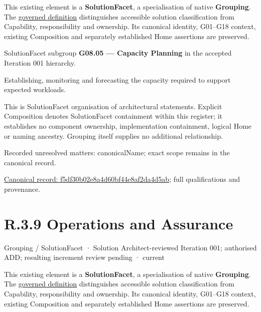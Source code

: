 This existing element is a \textbf{SolutionFacet}, a specialisation of native
\textbf{Grouping}. The \href{\detokenize{../../../../../../../governance/continuum-representation.md#solutionfacet-classification--1119-candidate}}{governed definition}
distinguishes accessible solution classification from Capability, responsibility
and ownership. Its canonical identity, G01–G18 context, existing Composition
and separately established Home assertions are preserved.



SolutionFacet subgroup \textbf{G08.05 — Capacity Planning} in the accepted Iteration 001 hierarchy.



Establishing, monitoring and forecasting the capacity required to support expected workloads.



This is SolutionFacet organisation of architectural statements. Explicit Composition denotes SolutionFacet containment within this register; it establishes no component ownership, implementation containment, logical Home or naming ancestry. Grouping itself supplies no additional relationship.


{\small Recorded unresolved matters: canonicalName; exact scope remains in the canonical record.}\par
{\footnotesize \href{../../../../../../../continuum/grouping/f5df30b02e8a4d60bf44e8af2da4d5ab.md}{Canonical record: f5df30b02e8a4d60bf44e8af2da4d5ab}; full qualifications and provenance.}\par
\section*{R.3.9 Operations and Assurance}
\label{navigation:R.3.9}

\label{element:16ebd2840f2246a4a9ec9991947f5db2}
{\small Grouping / SolutionFacet · Solution Architect-reviewed Iteration 001; authorised ADD; resulting increment review pending · current}\par

This existing element is a \textbf{SolutionFacet}, a specialisation of native
\textbf{Grouping}. The \href{\detokenize{../../../../../../../governance/continuum-representation.md#solutionfacet-classification--1119-candidate}}{governed definition}
distinguishes accessible solution classification from Capability, responsibility
and ownership. Its canonical identity, G01–G18 context, existing Composition
and separately established Home assertions are preserved.



